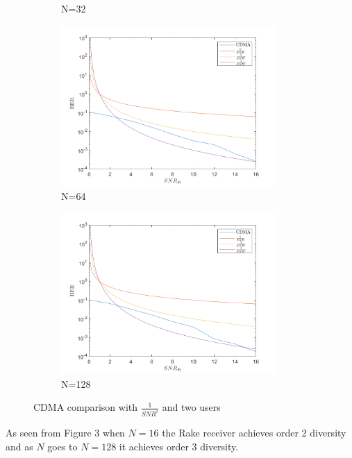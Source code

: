 \documentclass[12pt]{article}
\begin{document}
\begin{enumerate}
\begin{enumerate}
\begin{enumerate}
\begin{figure}[h!]
\begin{subfigure}[b]{0.4\textwidth}
									\caption{N=32}
								\end{subfigure}
								\begin{subfigure}[b]{0.4\textwidth}
									\centering
									\includegraphics[width=0.9\textwidth]{fig5.png}
									\caption{N=64}
								\end{subfigure}
								\begin{subfigure}[b]{0.4\textwidth}
									\centering
									\includegraphics[width=0.9\textwidth]{fig6.png}
									\caption{N=128}
								\end{subfigure}
								\caption{CDMA comparison with $\frac{1}{SNR^i}$ and two users}
							\end{figure}
						
							As seen from Figure 3 when $N=16$ the Rake receiver achieves order 2 diversity and as $N$ goes to $N=128$ it achieves order 3 diversity.
							

\end{enumerate}
\end{enumerate}
\end{enumerate}
\end{document}
